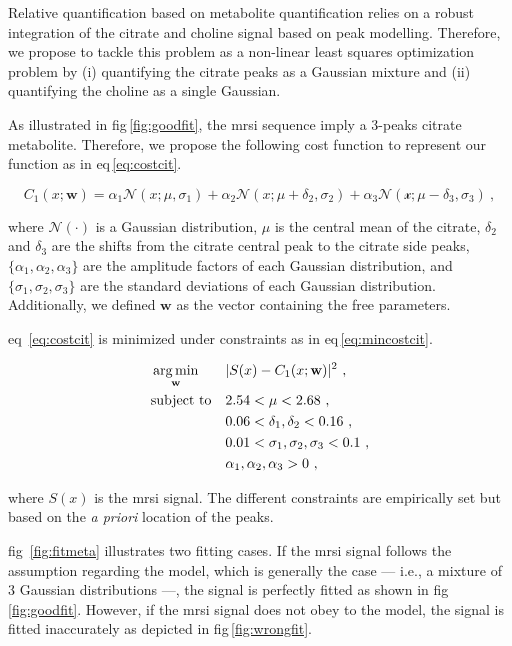 Relative quantification based on metabolite quantification relies on a robust integration of the citrate and choline signal based on peak modelling.
Therefore, we propose to tackle this problem as a non-linear least squares optimization problem by (i) quantifying the citrate peaks as a Gaussian mixture and (ii) quantifying the choline as a single Gaussian.

As illustrated in \acs{fig}\,\ref{fig:goodfit}, the \ac{mrsi} sequence imply a 3-peaks citrate metabolite.
Therefore, we propose the following cost function to represent our function as in \acs{eq}\,\eqref{eq:costcit}.

\begin{equation}
  C_1(x; \mathbf{w}) = \alpha_1 \mathcal{N}(x; \mu, \sigma_1) + \alpha_2 \mathcal{N}(x; \mu + \delta_2, \sigma_2) + \alpha_3 \mathcal{N(x; \mu - \delta_3, \sigma_3)} \ ,
  \label{eq:costcit}
\end{equation}

\noindent where $\mathcal{N}(\cdot)$ is a Gaussian distribution, $\mu$ is the central mean of the citrate, $\delta_2$ and $\delta_3$ are the shifts from the citrate central peak to the citrate side peaks, $\{\alpha_1, \alpha_2, \alpha_3\}$ are the amplitude factors of each Gaussian distribution, and $\{\sigma_1, \sigma_2, \sigma_3\}$ are the standard deviations of each Gaussian distribution. Additionally, we defined $\mathbf{w}$ as the vector containing the free parameters.

\Acl{eq}~\eqref{eq:costcit} is minimized under constraints as in \acs{eq}\,\eqref{eq:mincostcit}.


\begin{equation}
\begin{aligned}
& \operatorname*{arg\,min}_{\mathbf{w}} 
& & | S(x) - C_1(x; \mathbf{w}) |^{2} \ , \label{eq:mincostcit} \\
& \text{subject to}
& & 2.54 < \mu < 2.68 \ , \\
&&& 0.06 < \delta_1, \delta_2 < 0.16 \ , \\
&&& 0.01 < \sigma_1, \sigma_2, \sigma_3 < 0.1 \ , \\
&&& \alpha_1, \alpha_2, \alpha_3 > 0 \ ,
\end{aligned}
\end{equation}

\noindent where $S(x)$ is the \ac{mrsi} signal. The different constraints are empirically set but based on the \emph{a priori} location of the peaks.

\Acl{fig}~\ref{fig:fitmeta} illustrates two fitting cases.
If the \ac{mrsi} signal follows the assumption regarding the model, which is generally the case --- i.e., a mixture of 3 Gaussian distributions ---, the signal is perfectly fitted as shown in \acs{fig}\,\ref{fig:goodfit}.
However, if the \ac{mrsi} signal does not obey to the model, the signal is fitted inaccurately as depicted in \acs{fig}\,\ref{fig:wrongfit}.

